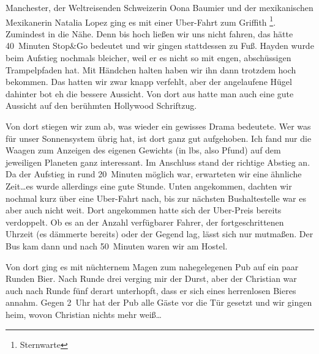 \vspace*{.3\paperheight}

\noindent
Manchester, der Weltreisenden Schweizerin Oona Baumier und der mexikanischen Mexikanerin Natalia Lopez ging es mit einer Uber-Fahrt zum Griffith \footnote{Sternwarte}.
Zumindest in die Nähe.
Denn bis hoch ließen wir uns nicht fahren, das hätte 40~Minuten Stop\&Go bedeutet und wir gingen stattdessen zu Fuß.
Hayden wurde beim Aufstieg nochmals bleicher, weil er es nicht so mit engen, abschüssigen Trampelpfaden hat.
Mit Händchen halten haben wir ihn dann trotzdem hoch bekommen.
Das  hatten wir zwar knapp verfehlt, aber der angelaufene Hügel dahinter bot eh die bessere Aussicht.
Von dort aus hatte man auch eine gute Aussicht auf den berühmten Hollywood Schriftzug.

Von dort stiegen wir zum  ab, was wieder ein gewisses Drama bedeutete.
Wer was für unser Sonnensystem übrig hat, ist dort ganz gut aufgehoben.
Ich fand nur die Waagen zum Anzeigen des eigenen Gewichts (in lbs, also Pfund) auf dem jeweiligen Planeten ganz interessant.
Im Anschluss stand der richtige Abstieg an.
Da der Aufstieg in rund 20~Minuten möglich war, erwarteten wir eine ähnliche Zeit\dots es wurde allerdings eine gute Stunde.
Unten angekommen, dachten wir nochmal kurz über eine Uber-Fahrt nach, bis zur nächsten Bushaltestelle war es aber auch nicht weit.
Dort angekommen hatte sich der Uber-Preis bereits verdoppelt.
Ob es an der Anzahl verfügbarer Fahrer, der fortgeschrittenen Uhrzeit (es dämmerte bereits) oder der Gegend lag, lässt sich nur mutmaßen.
Der Bus kam dann und nach 50~Minuten waren wir am Hostel.

Von dort ging es mit nüchternem Magen zum nahegelegenen Pub  auf ein paar Runden Bier.
Nach Runde drei verging mir der Durst, aber der Christian war auch nach Runde fünf derart unterhopft, dass er sich eines herrenlosen Bieres annahm.
Gegen 2~Uhr hat der Pub alle Gäste vor die Tür gesetzt und wir gingen heim, wovon Christian nichts mehr weiß\dots\\[1em]


